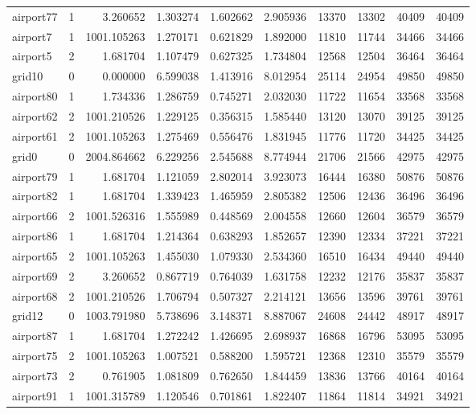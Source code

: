 \begin{longtable}{|l|r|r|r|r|r|r|r|r|r|}
airport77 & 1 & 3.260652 & 1.303274 & 1.602662 & 2.905936 & 13370 & 13302 & 40409 & 40409 \\
airport7 & 1 & 1001.105263 & 1.270171 & 0.621829 & 1.892000 & 11810 & 11744 & 34466 & 34466 \\
airport5 & 2 & 1.681704 & 1.107479 & 0.627325 & 1.734804 & 12568 & 12504 & 36464 & 36464 \\
grid10 & 0 & 0.000000 & 6.599038 & 1.413916 & 8.012954 & 25114 & 24954 & 49850 & 49850 \\
airport80 & 1 & 1.734336 & 1.286759 & 0.745271 & 2.032030 & 11722 & 11654 & 33568 & 33568 \\
airport62 & 2 & 1001.210526 & 1.229125 & 0.356315 & 1.585440 & 13120 & 13070 & 39125 & 39125 \\
airport61 & 2 & 1001.105263 & 1.275469 & 0.556476 & 1.831945 & 11776 & 11720 & 34425 & 34425 \\
grid0 & 0 & 2004.864662 & 6.229256 & 2.545688 & 8.774944 & 21706 & 21566 & 42975 & 42975 \\
airport79 & 1 & 1.681704 & 1.121059 & 2.802014 & 3.923073 & 16444 & 16380 & 50876 & 50876 \\
airport82 & 1 & 1.681704 & 1.339423 & 1.465959 & 2.805382 & 12506 & 12436 & 36496 & 36496 \\
airport66 & 2 & 1001.526316 & 1.555989 & 0.448569 & 2.004558 & 12660 & 12604 & 36579 & 36579 \\
airport86 & 1 & 1.681704 & 1.214364 & 0.638293 & 1.852657 & 12390 & 12334 & 37221 & 37221 \\
airport65 & 2 & 1001.105263 & 1.455030 & 1.079330 & 2.534360 & 16510 & 16434 & 49440 & 49440 \\
airport69 & 2 & 3.260652 & 0.867719 & 0.764039 & 1.631758 & 12232 & 12176 & 35837 & 35837 \\
airport68 & 2 & 1001.210526 & 1.706794 & 0.507327 & 2.214121 & 13656 & 13596 & 39761 & 39761 \\
grid12 & 0 & 1003.791980 & 5.738696 & 3.148371 & 8.887067 & 24608 & 24442 & 48917 & 48917 \\
airport87 & 1 & 1.681704 & 1.272242 & 1.426695 & 2.698937 & 16868 & 16796 & 53095 & 53095 \\
airport75 & 2 & 1001.105263 & 1.007521 & 0.588200 & 1.595721 & 12368 & 12310 & 35579 & 35579 \\
airport73 & 2 & 0.761905 & 1.081809 & 0.762650 & 1.844459 & 13836 & 13766 & 40164 & 40164 \\
airport91 & 1 & 1001.315789 & 1.120546 & 0.701861 & 1.822407 & 11864 & 11814 & 34921 & 34921 \\

\end{longtable}
